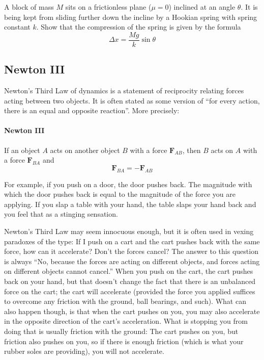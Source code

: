 \begin{exercise}\label{E:RampSpring0}
A block of mass $M$ sits on a frictionless plane ($μ =0$) inclined at an angle $θ$. It is being kept from sliding further down the incline by a Hookian spring with spring constant $k$. Show that the compression of the spring is given by the formula
$$
Δx = \frac{Mg}k \sin θ 
$$
\end{exercise}

\subsection{Newton III}

Newton's Third Law of dynamics is a statement of reciprocity relating forces acting between two objects. It is often stated as some version of “for every action, there is an equal and opposite reaction”. More precisely:
\paragraph{Newton III}
If an object $A$ acts on another object $B$ with a force $𝐅_{AB}$, then $B$ acts on $A$ with a force $𝐅_{BA}$ and 
$$
𝐅 _{BA} = - 𝐅_{AB}
$$

For example, if you push on a door, the door pushes back. The magnitude with which the door pushes back is equal to the magnitude of the force you are applying. If you slap a table with your hand, the table slaps your hand back and you feel that as a stinging sensation. 

Newton's Third Law may seem innocuous enough, but it is often used in vexing paradoxes of the type: If I push on a cart and the cart pushes back with the same force, how can it accelerate? Don't the forces cancel? The answer to this question is always “No, because the forces are acting on different objects, and forces acting on different objects cannot cancel.” When you push on the cart, the cart pushes back on your hand, but that doesn't change the fact that there is an unbalanced force on the cart; the cart will accelerate (provided the force you applied suffices to overcome any friction with the ground, ball bearings, and such). What can also happen though, is that when the cart pushes on you, you may also accelerate in the opposite direction of the cart's acceleration. What is stopping you from doing that is usually friction with the ground: The cart pushes on you, but friction also pushes on you, so if there is enough friction (which is what your rubber soles are providing), you will not accelerate. 

